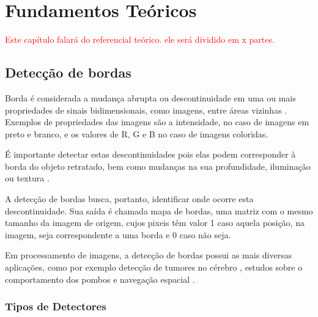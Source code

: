 \chapter{Fundamentos Teóricos} \label{refteor}

\textcolor{red}{Este capítulo falará do referencial teórico. ele será dividido em x partes.}

\section{Detecção de bordas}



Borda é considerada a mudança abrupta ou descontinuidade em uma ou mais propriedades de sinais bidimensionais, como imagens, entre áreas vizinhas \cite{li2009markov}. Exemplos de propriedades das imagens são a intensidade, no caso de imagens em preto e branco, e os valores de R, G e B no caso de imagens coloridas.

É importante detectar estas descontinuidades pois elas podem corresponder à borda do objeto retratado, bem como mudanças na sua profundidade, iluminação ou textura \cite{descontinuidades}.


A detecção de bordas busca, portanto, identificar onde ocorre esta descontinuidade. Sua saída é chamada mapa de bordas, uma matriz com o mesmo tamanho da imagem de origem, cujos pixeis têm valor 1 caso aquela posição, na imagem, seja correspondente a uma borda e 0 caso não seja.

Em processamento de imagens, a detecção de bordas possui as mais diversas aplicações, como por exemplo detecção de tumores no cérebro \cite{detectumor}, estudos sobre o comportamento dos pombos \cite{pigeon} e navegação espacial \cite{navegespacial}.

\subsection{Tipos de Detectores}

